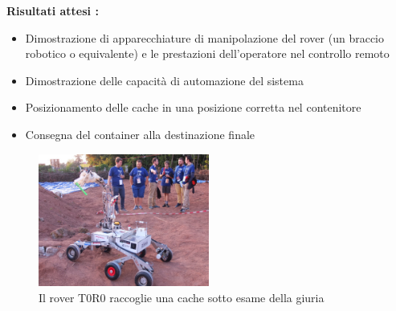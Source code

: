 \documentclass[%
corpo=11pt,
twoside,
 stile=classica,
oldstyle,
greek,%
]{toptesi}
\begin{document}
		\textbf{Risultati attesi :}
		\begin{itemize}
			\item Dimostrazione di apparecchiature di manipolazione del rover (un braccio robotico o equivalente)
			e le prestazioni dell'operatore nel controllo remoto
			\item Dimostrazione delle capacità di automazione del sistema
			\item Posizionamento delle cache in una posizione corretta nel contenitore
			\item Consegna del container alla destinazione finale
		\end{itemize}
		\begin{figure}
			\centering
			\includegraphics[width=0.5\textwidth]{pictures/cache1.jpg}
			\caption{Il rover T0R0 raccoglie una cache sotto esame della giuria}
			\label{fig:torocache}
		\end{figure}
\end{document}
